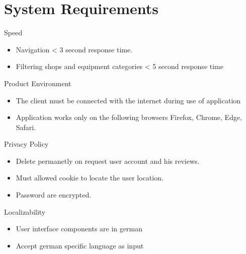 \section{System Requirements}
Speed
\begin{itemize}
\item Navigation < 3 second response time.
\item  Filtering shops and equipment categories < 5 second response time
\end{itemize}
\vspace*{1cm}
Product Environment
\begin{itemize}
\item The client must be connected with the internet during use of application
\item Application works only on the following browsers {Firefox, Chrome, Edge, Safari}.
\end{itemize}
\vspace*{1cm}
Privacy Policy
\begin{itemize}
\item Delete permanetly on request user account and his reviews.
\item Must allowed cookie to locate the user location.
\item Password are encrypted.
\end{itemize}
\vspace*{1cm}
Localizability 
\begin{itemize}
\item User interface components are in german
\item Accept german specific language as input
\end{itemize}